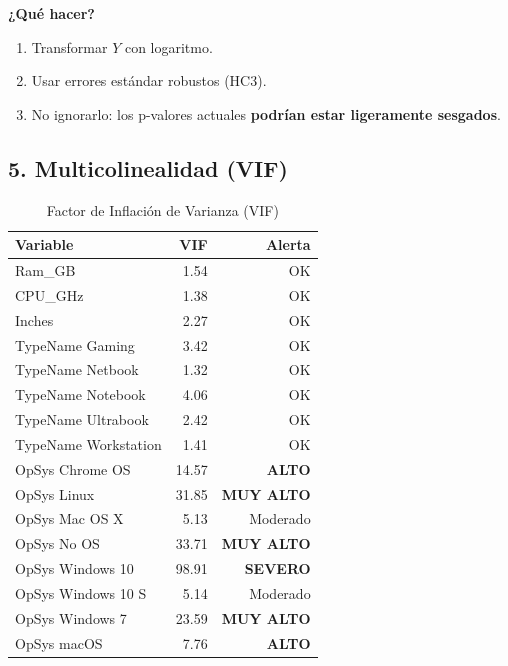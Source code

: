 \documentclass[12pt,a4paper]{article}
\begin{document}
\textbf{¿Qué hacer?}
\begin{enumerate}
    \item Transformar $Y$ con logaritmo.
    \item Usar errores estándar robustos (HC3).
    \item No ignorarlo: los p-valores actuales \textbf{podrían estar ligeramente sesgados}.
\end{enumerate}

\subsection{5. Multicolinealidad (VIF)}

\begin{table}[H]
\centering
\caption{Factor de Inflación de Varianza (VIF)}
\begin{tabular}{lrr}
\toprule
\textbf{Variable} & \textbf{VIF} & \textbf{Alerta} \\
\midrule
Ram\_GB & 1.54 & \textcolor{verdeok}{OK} \\
CPU\_GHz & 1.38 & \textcolor{verdeok}{OK} \\
Inches & 2.27 & \textcolor{verdeok}{OK} \\
TypeName Gaming & 3.42 & \textcolor{verdeok}{OK} \\
TypeName Netbook & 1.32 & \textcolor{verdeok}{OK} \\
TypeName Notebook & 4.06 & \textcolor{verdeok}{OK} \\
TypeName Ultrabook & 2.42 & \textcolor{verdeok}{OK} \\
TypeName Workstation & 1.41 & \textcolor{verdeok}{OK} \\
OpSys Chrome OS & 14.57 & \textcolor{rojoacento}{\textbf{ALTO}} \\
OpSys Linux & 31.85 & \textcolor{rojoacento}{\textbf{MUY ALTO}} \\
OpSys Mac OS X & 5.13 & \textcolor{verdeok}{Moderado} \\
OpSys No OS & 33.71 & \textcolor{rojoacento}{\textbf{MUY ALTO}} \\
OpSys Windows 10 & 98.91 & \textcolor{rojoacento}{\textbf{SEVERO}} \\
OpSys Windows 10 S & 5.14 & \textcolor{verdeok}{Moderado} \\
OpSys Windows 7 & 23.59 & \textcolor{rojoacento}{\textbf{MUY ALTO}} \\
OpSys macOS & 7.76 & \textcolor{rojoacento}{\textbf{ALTO}} \\
\bottomrule
\end{tabular}
\end{table}
\end{document}
